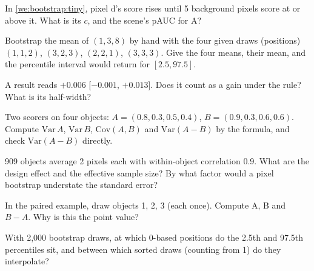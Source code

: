 \begin{checkyourself}
\item\label{ex:bootstrap:1} In \cref{we:bootstrap:tiny}, pixel d's score rises until 5 background pixels score at or above
it. What is its $c$, and the scene's pAUC for A?
\item\label{ex:bootstrap:2} Bootstrap the mean of $(1, 3, 8)$ by hand with the four given draws (positions)
$(1,1,2)$, $(3,2,3)$, $(2,2,1)$, $(3,3,3)$. Give the four means, their mean, and the percentile interval
 would return for $[2.5, 97.5]$.
\item\label{ex:bootstrap:3} A result reads $+0.006$ [$-0.001$, $+0.013$]. Does it count as a gain under the rule? What is
its half-width?
\item\label{ex:bootstrap:4} Two scorers on four objects: $A = (0.8, 0.3, 0.5, 0.4)$, $B = (0.9, 0.3, 0.6, 0.6)$. Compute
$\mathrm{Var}\,A$, $\mathrm{Var}\,B$, $\mathrm{Cov}(A,B)$ and $\mathrm{Var}(A - B)$ by the formula, and check
$\mathrm{Var}(A - B)$ directly.
\item\label{ex:bootstrap:5} 909 objects average 2 pixels each with within-object correlation 0.9. What are the design
effect and the effective sample size? By what factor would a pixel bootstrap understate the standard error?
\item\label{ex:bootstrap:6} In the paired example, draw objects 1, 2, 3 (each once). Compute A, B and $B - A$. Why is
this the point value?
\item\label{ex:bootstrap:7} With 2,000 bootstrap draws, at which 0-based positions do the 2.5th and 97.5th percentiles
sit, and between which sorted draws (counting from 1) do they interpolate?
\end{checkyourself}

